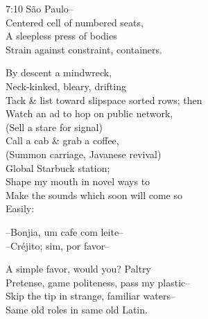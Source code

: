 

7:10 São Paulo-- \\
Centered cell of numbered seats, \\
A sleepless press of bodies \\
Strain against constraint, containers.

By descent a mindwreck, \\
Neck-kinked, bleary, drifting \\
Tack \& list toward slipspace sorted rows; then \\
Watch an ad to hop on public network, \\
(Sell a stare for signal) \\
Call a cab \& grab a coffee, \\
(Summon carriage, Javanese revival) \\
Global Starbuck station; \\
Shape my mouth in novel ways to \\
Make the sounds which soon will come so \\
Easily:

--Bonjia, um cafe com leite-- \\
--Créjito; sim, por favor--

A simple favor, would you? Paltry \\
Pretense, game politeness, pass my plastic-- \\
Skip the tip in strange, familiar waters-- \\
Same old roles in same old Latin.
